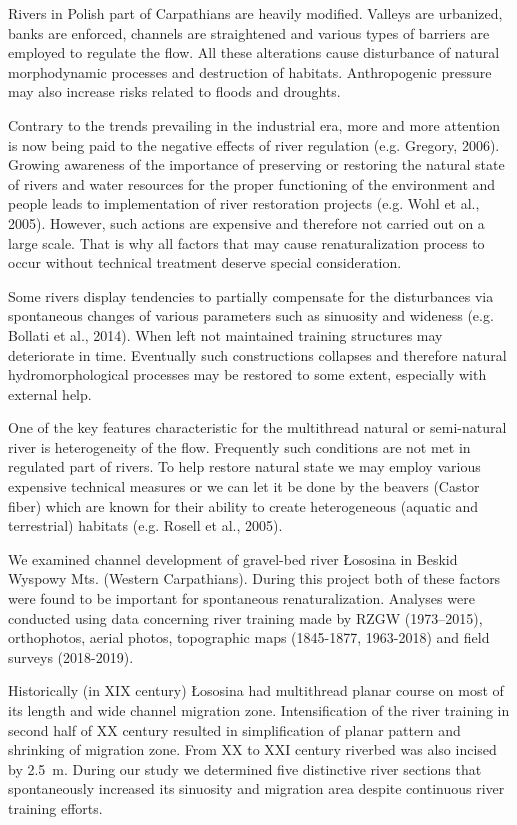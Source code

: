 {Rivers in Polish part of Carpathians are heavily modified. Valleys are urbanized, banks are enforced, channels are straightened and various types of barriers are employed to regulate the flow. All these alterations cause disturbance of natural morphodynamic processes and destruction of habitats. Anthropogenic pressure may also increase risks related to floods and droughts.
	
Contrary to the trends prevailing in the industrial era, more and more attention is now being paid to the negative effects of river regulation (e.g. Gregory, 2006). Growing awareness of the importance of preserving or restoring the natural state of rivers and water resources for the proper functioning of the environment and people leads to implementation of river restoration projects (e.g. Wohl et al., 2005). However, such actions are expensive and therefore not carried out on a large scale. That is why all factors that may cause renaturalization process to occur without technical treatment deserve special consideration.
	
Some rivers display tendencies to partially compensate for the disturbances via spontaneous changes of various parameters such as sinuosity and wideness (e.g. Bollati et al., 2014). When left not maintained training structures may deteriorate in time. Eventually such constructions collapses and therefore natural hydromorphological processes may be restored to some extent, especially with external help.
	
One of the key features characteristic for the multithread natural or semi-natural river is heterogeneity of the flow. Frequently such conditions are not met in regulated part of rivers. To help restore natural state we may employ various expensive technical measures or we can let it be done by the beavers (Castor fiber) which are known for their ability to create heterogeneous (aquatic and terrestrial) habitats (e.g. Rosell et al., 2005).
	
We examined channel development of gravel-bed river Łososina in Beskid Wyspowy Mts. (Western Carpathians). During this project both of these factors were found to be important for spontaneous renaturalization. Analyses were conducted using data concerning river training made by RZGW (1973–2015), orthophotos, aerial photos, topographic maps (1845-1877, 1963-2018) and field surveys (2018-2019). 
	
Historically (in XIX century) Łososina had multithread planar course on most of its length and wide channel migration zone. Intensification of the river training in second half of XX century resulted in simplification of planar pattern and shrinking of migration zone. From XX to XXI century riverbed was also incised by 2.5~m. During our study we determined five distinctive river sections that spontaneously increased its sinuosity and migration area despite continuous river training efforts.
	
}

